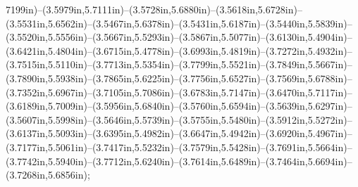 7199in)--(3.5979in,5.7111in)--(3.5728in,5.6880in)--(3.5618in,5.6728in)--(3.5531in,5.6562in)--(3.5467in,5.6378in)--(3.5431in,5.6187in)--(3.5440in,5.5839in)--(3.5520in,5.5556in)--(3.5667in,5.5293in)--(3.5867in,5.5077in)--(3.6130in,5.4904in)--(3.6421in,5.4804in)--(3.6715in,5.4778in)--(3.6993in,5.4819in)--(3.7272in,5.4932in)--(3.7515in,5.5110in)--(3.7713in,5.5354in)--(3.7799in,5.5521in)--(3.7849in,5.5667in)--(3.7890in,5.5938in)--(3.7865in,5.6225in)--(3.7756in,5.6527in)--(3.7569in,5.6788in)--(3.7352in,5.6967in)--(3.7105in,5.7086in)--(3.6783in,5.7147in)--(3.6470in,5.7117in)--(3.6189in,5.7009in)--(3.5956in,5.6840in)--(3.5760in,5.6594in)--(3.5639in,5.6297in)--(3.5607in,5.5998in)--(3.5646in,5.5739in)--(3.5755in,5.5480in)--(3.5912in,5.5272in)--(3.6137in,5.5093in)--(3.6395in,5.4982in)--(3.6647in,5.4942in)--(3.6920in,5.4967in)--(3.7177in,5.5061in)--(3.7417in,5.5232in)--(3.7579in,5.5428in)--(3.7691in,5.5664in)--(3.7742in,5.5940in)--(3.7712in,5.6240in)--(3.7614in,5.6489in)--(3.7464in,5.6694in)--(3.7268in,5.6856in);
